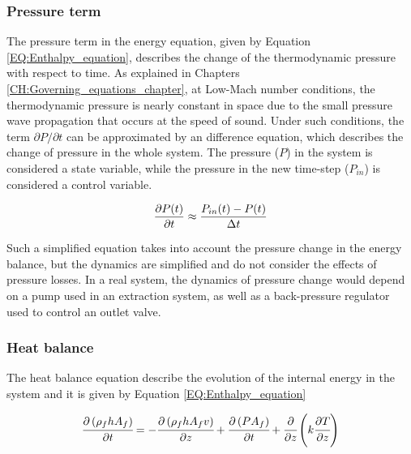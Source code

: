 \documentclass[../Article_Model_Parameters.tex]{subfiles}
\begin{document}
			
		
			\subsubsection{Pressure term} \label{CH: Pressure}
			
			The pressure term in the energy equation, given by Equation \ref{EQ:Enthalpy_equation}, describes the change of the thermodynamic pressure with respect to time. As explained in Chapters \ref{CH:Governing_equations_chapter}, at Low-Mach number conditions, the thermodynamic pressure is nearly constant in space due to the small pressure wave propagation that occurs at the speed of sound. Under such conditions, the term $\partial P/\partial t$ can be approximated by an difference equation, which describes the change of pressure in the whole system. The pressure ($P$) in the system is considered a state variable, while the pressure in the new time-step ($P_{in}$) is considered a control variable.
			
			{\footnotesize
				\begin{equation}
					\frac{\partial {\color{black}P}(t)}{\partial t} \approx \frac{{\color{black}P_{in}}(t) - {\color{black}P}(t) }{\Delta t}
			\end{equation}}
			
			Such a simplified equation takes into account the pressure change in the energy balance, but the dynamics are simplified and do not consider the effects of pressure losses. In a real system, the dynamics of pressure change would depend on a pump used in an extraction system, as well as a back-pressure regulator used to control an outlet valve.
						
			\subsubsection{Heat balance} \label{CH: heat_balance}
			
			The heat balance equation describe the evolution of the internal energy in the system and it is given by Equation \ref{EQ:Enthalpy_equation}
			
			{\footnotesize
				\begin{equation} \label{EQ:Enthalpy_equation}
					\cfrac{\partial \left(\rho_f {\color{black}h} A_f\right)}{\partial t} = - \cfrac{\partial \left( \rho_f {\color{black}h} A_f v \right)}{\partial z} + \cfrac{\partial \left(P A_f\right)}{\partial t} + \cfrac{\partial}{\partial z} \left( k \cfrac{\partial T}{\partial z} \right)
				\end{equation}
			}
			
\end{document}
